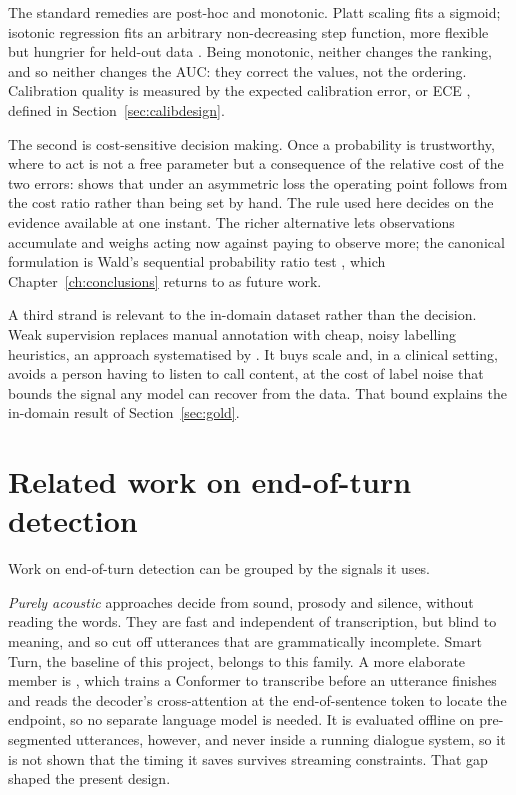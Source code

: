 The standard remedies are post-hoc and monotonic. Platt scaling fits a sigmoid; isotonic regression
\citep{zadrozny2002isotonic} fits an arbitrary non-decreasing step function, more flexible
but hungrier for held-out data \citep{niculescu2005predicting}. Being monotonic, neither
changes the ranking, and so neither changes the AUC: they correct the values, not the
ordering. Calibration quality is measured by the expected calibration error, or ECE
\citep{naeini2015ece,guo2017calibration}, defined in Section~\ref{sec:calibdesign}.

The second is cost-sensitive decision making. Once a probability is trustworthy, where to
act is not a free parameter but a consequence of the relative cost of the two errors:
\citet{elkan2001cost} shows that under an asymmetric loss the operating point follows from
the cost ratio rather than being set by hand. The rule used here decides on the evidence
available at one instant. The richer alternative lets observations accumulate and weighs
acting now against paying to observe more; the canonical formulation is Wald's sequential
probability ratio test \citep{wald1945sequential}, which Chapter~\ref{ch:conclusions}
returns to as future work.

A third strand is relevant to the in-domain dataset rather than the decision. Weak
supervision replaces manual annotation with cheap, noisy labelling heuristics, an approach
systematised by \citet{ratner2017snorkel}. It buys
scale and, in a clinical setting, avoids a person having to listen to call content, at the
cost of label noise that bounds the signal any model can recover from the data. That bound explains the in-domain result of Section~\ref{sec:gold}.

\section{Related work on end-of-turn detection}
\label{sec:related}

Work on end-of-turn detection can be grouped by the signals it uses.

\emph{Purely acoustic} approaches decide from sound, prosody and silence, without reading
the words. They are fast and independent of transcription, but blind to meaning, and so
cut off utterances that are grammatically incomplete. Smart Turn, the baseline of this
project, belongs to this family. A more elaborate member is
\citet{zink2024predictive}, which trains a Conformer to transcribe before an utterance
finishes and reads the decoder's cross-attention at the end-of-sentence token to locate the
endpoint, so no separate language model is needed. It is evaluated offline on pre-segmented
utterances, however, and never inside a running dialogue system, so it is not shown that the
timing it saves survives streaming constraints. That gap shaped the present design.

